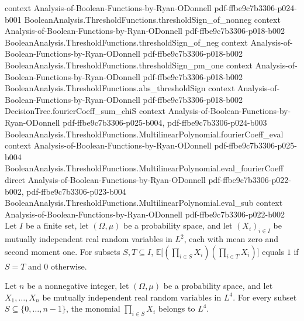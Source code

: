 \begin{theorem}
  {context}
  {Analysis-of-Boolean-Functions-by-Ryan-ODonnell}
  {pdf-ffbe9c7b3306-p024-b001}
\proofstep
  {BooleanAnalysis.ThresholdFunctions.thresholdSign_of_nonneg}
  {context}
  {Analysis-of-Boolean-Functions-by-Ryan-ODonnell}
  {pdf-ffbe9c7b3306-p018-b002}
\proofstep
  {BooleanAnalysis.ThresholdFunctions.thresholdSign_of_neg}
  {context}
  {Analysis-of-Boolean-Functions-by-Ryan-ODonnell}
  {pdf-ffbe9c7b3306-p018-b002}
\proofstep
  {BooleanAnalysis.ThresholdFunctions.thresholdSign_pm_one}
  {context}
  {Analysis-of-Boolean-Functions-by-Ryan-ODonnell}
  {pdf-ffbe9c7b3306-p018-b002}
\proofstep
  {BooleanAnalysis.ThresholdFunctions.abs_thresholdSign}
  {context}
  {Analysis-of-Boolean-Functions-by-Ryan-ODonnell}
  {pdf-ffbe9c7b3306-p018-b002}
\proofstep
  {DecisionTree.fourierCoeff_sum_chiS}
  {context}
  {Analysis-of-Boolean-Functions-by-Ryan-ODonnell}
  {pdf-ffbe9c7b3306-p025-b004,
    pdf-ffbe9c7b3306-p024-b003}
\proofstep
  {BooleanAnalysis.ThresholdFunctions.MultilinearPolynomial.fourierCoeff_eval}
  {context}
  {Analysis-of-Boolean-Functions-by-Ryan-ODonnell}
  {pdf-ffbe9c7b3306-p025-b004}
\proofstep
  {BooleanAnalysis.ThresholdFunctions.MultilinearPolynomial.eval_fourierCoeff}
  {direct}
  {Analysis-of-Boolean-Functions-by-Ryan-ODonnell}
  {pdf-ffbe9c7b3306-p022-b002,
    pdf-ffbe9c7b3306-p023-b004}
\proofstep
  {BooleanAnalysis.ThresholdFunctions.MultilinearPolynomial.eval_sub}
  {context}
  {Analysis-of-Boolean-Functions-by-Ryan-ODonnell}
  {pdf-ffbe9c7b3306-p022-b002}
Let $I$ be a finite set, let $(\Omega,\mu)$ be a probability space, and let $(X_i)_{i\in
I}$ be mutually independent real random variables in $L^2$, each with mean zero and
second moment one. For subsets $S,T\subseteq I$, $\mathbb E\big[(\prod_{i\in
S}X_i)(\prod_{i\in T}X_i)\big]$ equals $1$ if $S=T$ and $0$ otherwise.
\end{theorem}

\begin{theorem}
\leanok
{}
Let $n$ be a nonnegative integer, let $(\Omega,\mu)$ be a probability space, and let
$X_1,\ldots,X_n$ be mutually independent real random variables in $L^4$. For every
subset $S\subseteq\{0,\ldots,n-1\}$, the monomial $\prod_{i\in S}X_i$ belongs to $L^4$.
\end{theorem}

